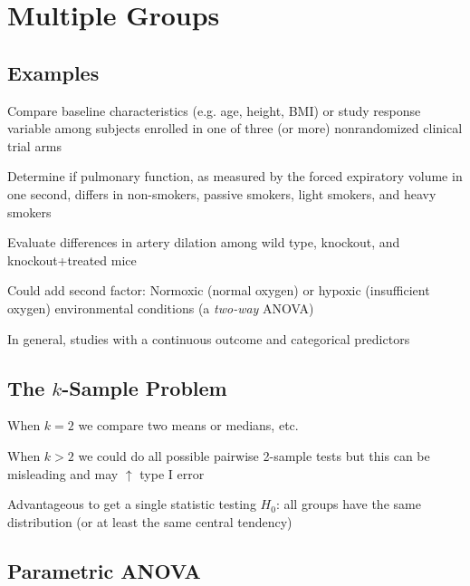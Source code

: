 

\chapter{Multiple Groups}
\section{Examples}

\bi
  \item Compare baseline characteristics (e.g. age, height, BMI) or
    study response variable among subjects enrolled in one of three
    (or more) nonrandomized clinical trial arms
  \item Determine if pulmonary function, as measured by the forced
    expiratory volume in one second, differs in non-smokers, passive
    smokers, light smokers, and heavy smokers 
  \item Evaluate differences in artery dilation among wild type,
    knockout, and knockout+treated mice 
  \bi
    \item Could add second factor: Normoxic (normal oxygen) or hypoxic
      (insufficient oxygen) environmental conditions (a
      \textit{two-way} ANOVA) 
  \ei
  \item In general, studies with a continuous outcome and categorical
    predictors 
\ei


\section{The $k$-Sample Problem} 
\bi
\item When $k=2$ we compare two means or medians, etc.
\item When $k>2$ we could do all possible pairwise 2-sample tests but
  this can be misleading and may $\uparrow$ type I error
\item Advantageous to get a single statistic testing $H_{0}$: all
  groups have the same distribution (or at least the same central
  tendency)
\ei

\section{Parametric ANOVA}
